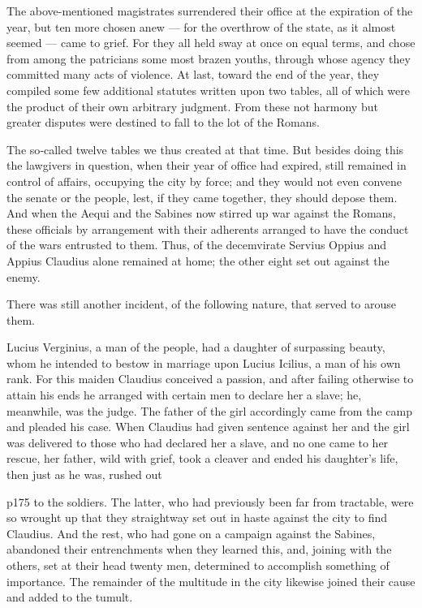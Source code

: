 The above-mentioned magistrates surrendered their office at the expiration of the year, but ten more chosen anew \texthebrew{—} for the overthrow of the state, as it almost seemed \texthebrew{—} came to grief. For they all held sway at once on equal terms, and chose from among the patricians some most brazen youths, through whose agency they committed many acts of violence. At last, toward the end of the year, they compiled some few additional statutes written upon two tables, all of which were the product of their own arbitrary judgment. From these not harmony but greater disputes were destined to fall to the lot of the Romans.

The so\texthebrew{‑}called twelve tables we thus created at that time. But besides doing this the lawgivers in question, when their year of office had expired, still remained in control of affairs, occupying the city by force; and they would not even convene the senate or the people, lest, if they came together, they should depose them. And when the Aequi and the Sabines now stirred up war against the Romans, these officials by arrangement with their adherents arranged to have the conduct of the wars entrusted to them. Thus, of the decemvirate Servius Oppius and Appius Claudius alone remained at home; the other eight set out against the enemy.

There was still another incident, of the following nature, that served to arouse them.

Lucius Verginius, a man of the people, had a daughter of surpassing beauty, whom he intended to bestow in marriage upon Lucius Icilius, a man of his own rank. For this maiden Claudius conceived a passion, and after failing otherwise to attain his ends he arranged with certain men to declare her a slave; he, meanwhile, was the judge. The father of the girl accordingly came from the camp and pleaded his case. When Claudius had given sentence against her and the girl was delivered to those who had declared her a slave, and no one came to her rescue, her father, wild with grief, took a cleaver and ended his daughter's life, then just as he was, rushed out

p175 to the soldiers. The latter, who had previously been far from tractable, were so wrought up that they straightway set out in haste against the city to find Claudius. And the rest, who had gone on a campaign against the Sabines, abandoned their entrenchments when they learned this, and, joining with the others, set at their head twenty men, determined to accomplish something of importance. The remainder of the multitude in the city likewise joined their cause and added to the tumult.

